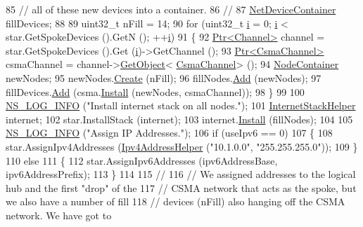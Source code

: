 \begin{DoxyCode}
85   \textcolor{comment}{// all of these new devices into a container.}
86   \textcolor{comment}{//}
87   \hyperlink{classns3_1_1NetDeviceContainer}{NetDeviceContainer} fillDevices;
88 
89   uint32\_t nFill = 14;
90   \textcolor{keywordflow}{for} (uint32\_t \hyperlink{bernuolliDistribution_8m_a6f6ccfcf58b31cb6412107d9d5281426}{i} = 0; \hyperlink{bernuolliDistribution_8m_a6f6ccfcf58b31cb6412107d9d5281426}{i} < star.GetSpokeDevices ().GetN (); ++\hyperlink{bernuolliDistribution_8m_a6f6ccfcf58b31cb6412107d9d5281426}{i})
91     \{
92       \hyperlink{classns3_1_1Ptr}{Ptr<Channel>} channel = star.GetSpokeDevices ().Get (\hyperlink{bernuolliDistribution_8m_a6f6ccfcf58b31cb6412107d9d5281426}{i})->GetChannel ();
93       \hyperlink{classns3_1_1Ptr}{Ptr<CsmaChannel>} csmaChannel = channel->\hyperlink{classns3_1_1Object_a13e18c00017096c8381eb651d5bd0783}{GetObject}<
      \hyperlink{classns3_1_1CsmaChannel}{CsmaChannel}> ();
94       \hyperlink{classns3_1_1NodeContainer}{NodeContainer} newNodes;
95       newNodes.\hyperlink{classns3_1_1NodeContainer_a787f059e2813e8b951cc6914d11dfe69}{Create} (nFill);
96       fillNodes.\hyperlink{classns3_1_1NodeContainer_aa60b3a0e70f2fb324e16ffcf8bf31fcb}{Add} (newNodes);
97       fillDevices.\hyperlink{classns3_1_1NetDeviceContainer_a7ca8bc1d7ec00fd4fcc63869987fbda5}{Add} (csma.\hyperlink{classns3_1_1CsmaHelper_af79a91372595230b0817200270ab84e7}{Install} (newNodes, csmaChannel));
98     \}
99 
100   \hyperlink{group__logging_gafbd73ee2cf9f26b319f49086d8e860fb}{NS\_LOG\_INFO} (\textcolor{stringliteral}{"Install internet stack on all nodes."});
101   \hyperlink{classns3_1_1InternetStackHelper}{InternetStackHelper} internet;
102   star.InstallStack (internet);
103   internet.\hyperlink{classns3_1_1InternetStackHelper_a6645b412f31283d2d9bc3d8a95cebbc0}{Install} (fillNodes);
104 
105   \hyperlink{group__logging_gafbd73ee2cf9f26b319f49086d8e860fb}{NS\_LOG\_INFO} (\textcolor{stringliteral}{"Assign IP Addresses."});
106   \textcolor{keywordflow}{if} (useIpv6 == 0)
107     \{
108       star.AssignIpv4Addresses (\hyperlink{classns3_1_1Ipv4AddressHelper}{Ipv4AddressHelper} (\textcolor{stringliteral}{"10.1.0.0"}, \textcolor{stringliteral}{"255.255.255.0"}));
109     \}
110   \textcolor{keywordflow}{else}
111     \{
112       star.AssignIpv6Addresses (ipv6AddressBase, ipv6AddressPrefix);
113     \}
114 
115   \textcolor{comment}{//}
116   \textcolor{comment}{// We assigned addresses to the logical hub and the first "drop" of the }
117   \textcolor{comment}{// CSMA network that acts as the spoke, but we also have a number of fill}
118   \textcolor{comment}{// devices (nFill) also hanging off the CSMA network.  We have got to }

\end{DoxyCode}
